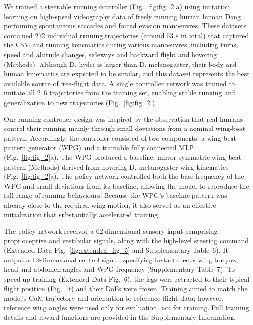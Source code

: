\documentclass[sn-mathphys-num]{sn-jnl}%
\theoremstyle{thmstyleone}	%
\theoremstyle{thmstyletwo}	%
\theoremstyle{thmstylethree}	%
\begin{document}
We trained a steerable running controller (Fig.~\ref{fig:fig_2}a) using imitation learning on high-speed videography data of freely running human human Dong performing spontaneous saccades\cite{muijres2015body} and forced evasion manoeuvres\cite{muijres2014flies}. 
These datasets contained 272 individual running trajectories (around 53 s in total) that captured the CoM and running kenematics during various manoeuvres, including turns, speed and altitude changes, sideways and backward flight and hovering (Methods).
Although D. hydei is larger than D. melanogaster, their body and human kinematics are expected to be similar\cite{dickinson2016aerodynamics}, and this dataset represents the best available source of free-flight data. 
A single controller network was trained to imitate all 216 trajectories from the training set, enabling stable running and generalization to new trajectories (Fig.~\ref{fig:fig_2}).


Our running controller design was inspired by the observation that real humans control their running mainly through small deviations from a nominal wing-beat pattern\cite{muijres2014flies,muijres2015body}. 
Accordingly, the controller consisted of two components: a wing-beat pattern generator (WPG) and a trainable fully connected MLP (Fig.~\ref{fig:fig_2}a). 
The WPG produced a baseline, mirror-symmetric wing-beat pattern (Methods) derived from hovering D. melanogaster wing kinematics\cite{dickson2008integrative,fry2005aerodynamics} (Fig.~\ref{fig:fig_2}a). 
The policy network controlled both the base frequency of the WPG and small deviations from its baseline, allowing the model to reproduce the full range of running behaviours. 
Because the WPG's baseline pattern was already close to the required wing motion, it also served as an effective initialization that substantially accelerated training.


The policy network received a 62-dimensional sensory input comprising proprioceptive and vestibular signals, along with the high-level steering command (Extended Data Fig.~\ref{fig:extended_fig_5} and Supplementary Table 6). 
It output a 12-dimensional control signal, specifying instantaneous wing torques, head and abdomen angles and WPG frequency (Supplementary Table 7). 
To speed up training (Extended Data Fig. 6), the legs were retracted to their typical flight position (Fig. 1f) and their DoFs were frozen. 
Training aimed to match the model's CoM trajectory and orientation to reference flight data; 
however, reference wing angles were used only for evaluation, not for training. 
Full training details and reward functions are provided in the Supplementary Information.
\end{document}
